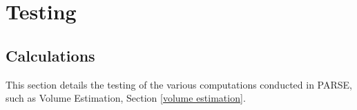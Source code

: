 \chapter{Testing}
\label{testing}
\section{Calculations}
\label{calculations}
This section details the testing of the various computations conducted in PARSE, such as Volume Estimation, Section \ref{volume estimation}.

